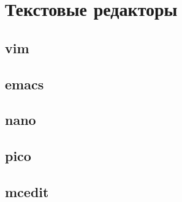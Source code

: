 \chapter{Текстовые редакторы}
\section{vim}
\section{emacs}
\section{nano}
\section{pico}
\section{mcedit}

